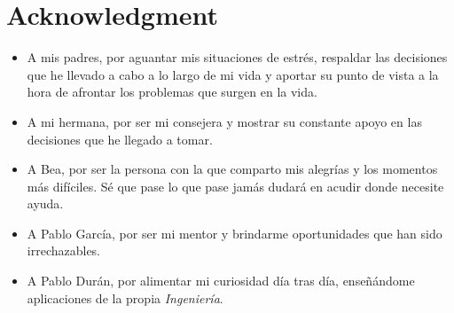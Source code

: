 
\chapter{Acknowledgment}

\begin{itemize}

\item A mis padres, por aguantar mis situaciones de estrés, respaldar las decisiones que he llevado a cabo a lo largo de mi vida y aportar su punto de vista a la hora de afrontar los problemas que surgen en la vida.
\item A mi hermana, por ser mi consejera y mostrar su constante apoyo en las decisiones que he llegado a tomar.
\item A Bea, por ser la persona con la que comparto mis alegrías y los momentos más difíciles. Sé que pase lo que pase jamás dudará en acudir donde necesite ayuda.
\item A Pablo García, por ser mi mentor y brindarme oportunidades que han sido irrechazables.
\item A Pablo Durán, por alimentar mi curiosidad día tras día, enseñándome aplicaciones de la propia \textit{Ingeniería}.

\end{itemize}
